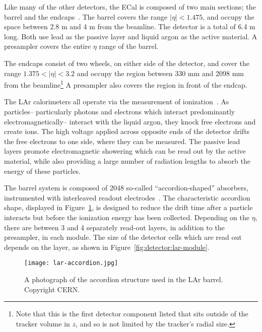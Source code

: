 Like many of the other detectors, the ECal is composed of two main sections; the barrel and the endcaps~\cite{ATLASPaper}. The barrel covers the range $|\eta| < 1.475$, and occupy the space between 2.8 m and 4 m from the beamline. The detector is a total of 6.4 m long. Both use lead as the passive layer and liquid argon as the active material. A presampler covers the entire $\eta$ range of the barrel.

The endcaps consist of two wheels, on either side of the detector, and cover the range $1.375 < |\eta| < 3.2$ and occupy the region between 330 mm and 2098 mm from the beamline\footnote{Note that this is the first detector component listed that sits outside of the tracker volume in $z$, and so is not limited by the tracker's radial size.} A presampler also covers the region in front of the endcap.

The LAr calorimeters all operate via the measurement of ionization~\cite{Detectors,Wigmans}. As particles-- particularly photons and electrons which interact predominantly electromagnetically-- interact with the liquid argon, they knock free electrons and create ions. The high voltage applied across opposite ends of the detector drifts the free electrons to one side, where they can be measured. The passive lead layers promote electromagnetic showering which can be read out by the active material, while also providing a large number of radiation lengths to absorb the energy of these particles.

The barrel system is composed of 2048 so-called ``accordion-shaped'' absorbers, instrumented with interleaved readout electrodes~\cite{ATLASPaper}. The characteristic accordion shape, displayed in Figure~\ref{fig:detector:lar-accordion}, is designed to reduce the drift time after a particle interacts but before the ionization energy has been collected. Depending on the $\eta$, there are between 3 and 4 separately read-out layers, in addition to the presampler, in each module. The size of the detector cells which are read out depends on the layer, as shown in Figure~\ref{fig:detector:lar-module}. 


\begin{figure}
\centering
\texttt{[image: lar-accordion.jpg]}
\label{fig:detector:lar-accordion}
\caption{A photograph of the accordion structure used in the LAr barrel. Copyright CERN.}
\end{figure}


